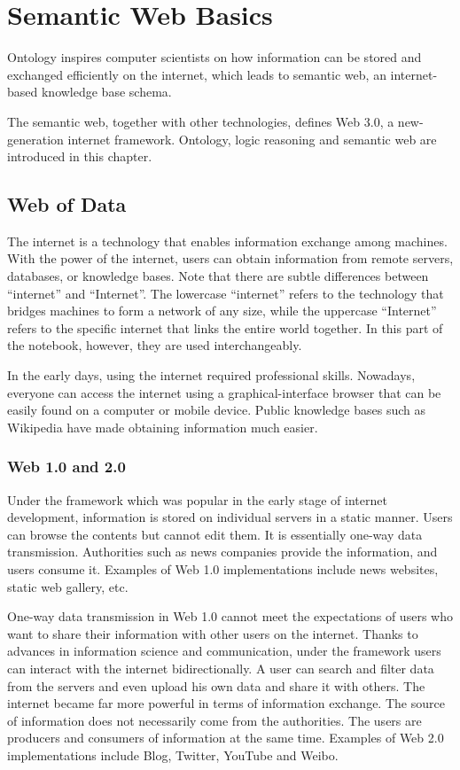 \chapter{Semantic Web Basics} \label{ch:briefintrosemanticweb}

Ontology inspires computer scientists on how information can be stored and exchanged efficiently on the internet, which leads to semantic web, an internet-based knowledge base schema. 

The semantic web, together with other technologies, defines Web 3.0, a new-generation internet framework. Ontology, logic reasoning and semantic web are introduced in this chapter.

\section{Web of Data}

The internet is a technology that enables information exchange among machines. With the power of the internet, users can obtain information from remote servers, databases, or knowledge bases. Note that there are subtle differences between ``internet'' and ``Internet''. The lowercase ``internet'' refers to the technology that bridges machines to form a network of any size, while the uppercase ``Internet'' refers to the specific internet that links the entire world together. In this part of the notebook, however, they are used interchangeably.

In the early days, using the internet required professional skills. Nowadays, everyone can access the internet using a graphical-interface browser that can be easily found on a computer or mobile device. Public knowledge bases such as Wikipedia have made obtaining information much easier.

\subsection{Web 1.0 and 2.0}

Under the  framework which was popular in the early stage of internet development, information is stored on individual servers in a static manner. Users can browse the contents but cannot edit them. It is essentially one-way data transmission. Authorities such as news companies provide the information, and users consume it. Examples of Web 1.0 implementations include news websites, static web gallery, etc.

One-way data transmission in Web 1.0 cannot meet the expectations of users who want to share their information with other users on the internet. Thanks to advances in information science and communication, under the  framework users can interact with the internet bidirectionally. A user can search and filter data from the servers and even upload his own data and share it with others. The internet became far more powerful in terms of information exchange. The source of information does not necessarily come from the authorities. The users are producers and consumers of information at the same time. Examples of Web 2.0 implementations include Blog, Twitter, YouTube and Weibo.

